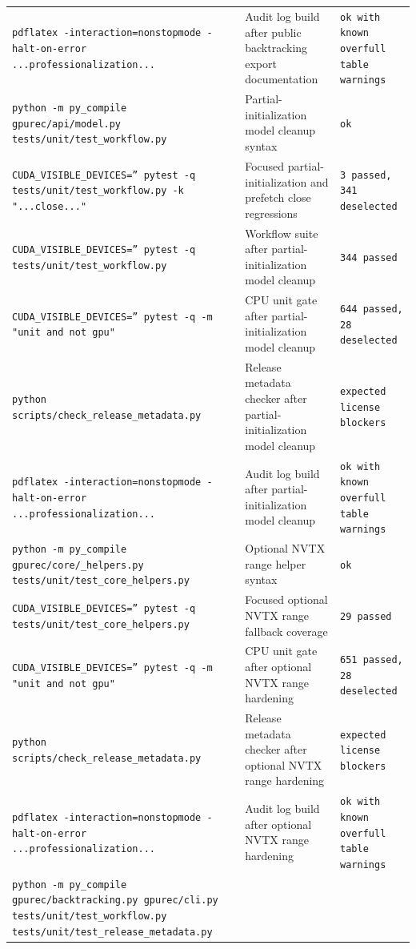 \documentclass[11pt]{article}
\begin{document}
\begin{center}
\begin{tabular}{lll}
\texttt{pdflatex -interaction=nonstopmode -halt-on-error ...professionalization...} &
Audit log build after public backtracking export documentation &
\texttt{ok with known overfull table warnings} \\
\texttt{python -m py\_compile gpurec/api/model.py tests/unit/test\_workflow.py} &
Partial-initialization model cleanup syntax &
\texttt{ok} \\
\texttt{CUDA\_VISIBLE\_DEVICES='' pytest -q tests/unit/test\_workflow.py -k "...close..."} &
Focused partial-initialization and prefetch close regressions &
\texttt{3 passed, 341 deselected} \\
\texttt{CUDA\_VISIBLE\_DEVICES='' pytest -q tests/unit/test\_workflow.py} &
Workflow suite after partial-initialization model cleanup &
\texttt{344 passed} \\
\texttt{CUDA\_VISIBLE\_DEVICES='' pytest -q -m "unit and not gpu"} &
CPU unit gate after partial-initialization model cleanup &
\texttt{644 passed, 28 deselected} \\
\texttt{python scripts/check\_release\_metadata.py} &
Release metadata checker after partial-initialization model cleanup &
\texttt{expected license blockers} \\
\texttt{pdflatex -interaction=nonstopmode -halt-on-error ...professionalization...} &
Audit log build after partial-initialization model cleanup &
\texttt{ok with known overfull table warnings} \\
\texttt{python -m py\_compile gpurec/core/\_helpers.py tests/unit/test\_core\_helpers.py} &
Optional NVTX range helper syntax &
\texttt{ok} \\
\texttt{CUDA\_VISIBLE\_DEVICES='' pytest -q tests/unit/test\_core\_helpers.py} &
Focused optional NVTX range fallback coverage &
\texttt{29 passed} \\
\texttt{CUDA\_VISIBLE\_DEVICES='' pytest -q -m "unit and not gpu"} &
CPU unit gate after optional NVTX range hardening &
\texttt{651 passed, 28 deselected} \\
\texttt{python scripts/check\_release\_metadata.py} &
Release metadata checker after optional NVTX range hardening &
\texttt{expected license blockers} \\
\texttt{pdflatex -interaction=nonstopmode -halt-on-error ...professionalization...} &
Audit log build after optional NVTX range hardening &
\texttt{ok with known overfull table warnings} \\
\texttt{python -m py\_compile gpurec/backtracking.py gpurec/cli.py tests/unit/test\_workflow.py tests/unit/test\_release\_metadata.py} &

\end{tabular}
\end{center}
\end{document}
